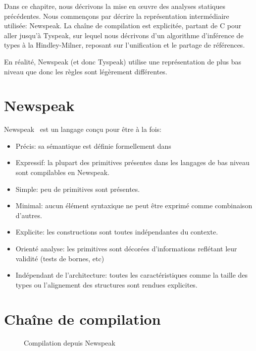 Dans ce chapitre, nous décrivons la mise en œuvre des analyses statiques
précédentes. Nous commençons par décrire la représentation intermédiaire
utilisée: Newspeak. La chaîne de compilation est explicitée, partant de C pour
aller jusqu'à Tyspeak, sur lequel nous décrivons d'un algorithme d'inférence de
types à la Hindley-Milner, reposant sur l'unification et le partage de
références.

En réalité, Newspeak (et donc Tyspeak) utilise une représentation de plus bas
niveau que \langname donc les règles sont légèrement différentes.


\section{Newspeak}
\label{sec:npk}

Newspeak~\cite{newspeak} est un langage conçu pour être à la fois:

\begin{itemize}
  \item Précis: sa sémantique est définie formellement dans~\cite{newspeak}
  \item Expressif: la plupart des primitives présentes dans les
    langages de bas niveau sont compilables en Newspeak.
  \item Simple: peu de primitives sont présentes.
  \item Minimal: aucun élément syntaxique ne peut être exprimé
    comme combinaison d'autres.
  \item Explicite: les constructions sont toutes indépendantes du
    contexte.
  \item Orienté analyse: les primitives sont décorées d'informations
    reflétant leur validité (tests de bornes, etc)
  \item Indépendant de l'architecture: toutes les caractéristiques comme
    la taille des types ou l'alignement des structures sont rendues explicites.
\end{itemize}


\section{Chaîne de compilation}

\begin{figure}
  \centering
  
  \caption{Compilation depuis Newspeak}
\label{fig:compil-npk}
\end{figure}

